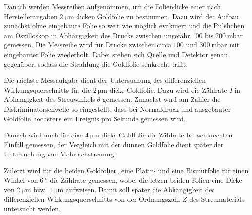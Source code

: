 Danach werden Messreihen aufgenommen, um die Foliendicke einer nach Herstellerangaben $\SI{2}{\micro\meter}$ dicken Goldfolie zu bestimmen. Dazu wird der Aufbau zunächst ohne eingebaute Folie so weit wie möglich evakuiert und die Pulshöhen am Oszilloskop in Abhängigkeit des Drucks zwischen ungefähr $100$ bis $\SI{200}{\milli\bar}$ gemessen. Die Messreihe wird für Drücke zwischen circa $100$ und $\SI{300}{\milli\bar}$ mit eingebauter Folie wiederholt. Dabei stehen sich Quelle und Detektor genau gegenüber, sodass die Strahlung die Goldfolie senkrecht trifft.

Die nächste Messaufgabe dient der Untersuchung des differenziellen Wirkungsquerschnitts für die $\SI{2}{\micro\meter}$ dicke Goldfolie. Dazu wird die Zählrate $I$ in Abhängigkeit des Streuwinkels $\theta$ gemessen. Zunächst wird am Zähler die Diskriminatorschwelle so eingestellt, dass bei Normaldruck und ausgebauter Goldfolie höchstens ein Ereignis pro Sekunde gemessen wird.

Danach wird auch für eine $\SI{4}{\micro\meter}$ dicke Goldfolie die Zählrate bei senkrechtem Einfall gemessen, der Vergleich mit der dünnen Goldfolie dient später der Untersuchung von Mehrfachstreuung.

Zuletzt wird für die beiden Goldfolien, eine Platin- und eine Bismutfolie für einen Winkel von $\SI{6}{\degree}$ die Zählrate gemessen, wobei die letzen beiden Folien eine Dicke von $\SI{2}{\micro\meter}$ bzw. $\SI{1}{\micro\meter}$ aufweisen. Damit soll später die Abhängigkeit des differenziellen Wirkungsquerschnitts von der Ordnungszahl $Z$ des Streumaterials untersucht werden.
